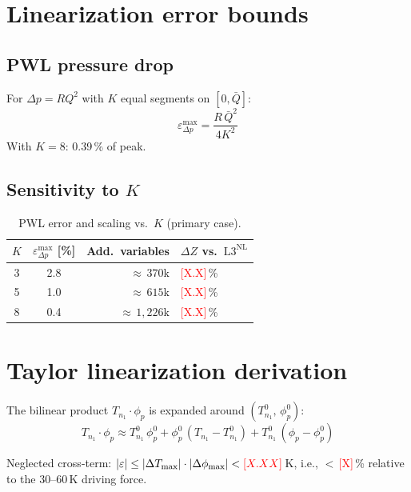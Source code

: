 \documentclass[review,3p]{elsarticle}
\newcommand{\placeholder}[1]{\textcolor{red}{[#1]}}
\newcommand{\Lnl}{\mathrm{L3}^{\mathrm{NL}}}
\begin{document}
\section{Linearization error bounds}
\label{app:pwl}

\subsection*{PWL pressure drop}

For $\Delta p = R Q^2$ with $K$ equal segments on $[0, \bar{Q}]$:
\begin{equation*}
  \varepsilon_{\Delta p}^{\max} = \frac{R\, \bar{Q}^2}{4K^2}
\end{equation*}
With $K=8$: 0.39\,\% of peak.

\subsection*{Sensitivity to $K$}

\begin{table}[htbp]
\centering
\caption{PWL error and scaling vs.\ $K$ (primary case).}
\label{tab:pwl_sensitivity}
\small
\begin{tabular}{@{} c c r l @{}}
\toprule
$K$ & $\varepsilon_{\Delta p}^{\max}$ [\%]
  & Add.\ variables & $\Delta Z$ vs.\ $\Lnl$ \\
\midrule
3 & 2.8 & ${\approx}\,370$k & \placeholder{X.X}\,\% \\
5 & 1.0 & ${\approx}\,615$k & \placeholder{X.X}\,\% \\
8 & 0.4 & ${\approx}\,1{,}226$k & \placeholder{X.X}\,\% \\
\bottomrule
\end{tabular}
\end{table}

\section{Taylor linearization derivation}
\label{app:taylor_derivation}

The bilinear product $T_{n_1} \cdot \phi_p$ is expanded around
$(T_{n_1}^0,\, \phi_p^0)$:
\begin{equation}
  T_{n_1} \cdot \phi_p \approx
    T_{n_1}^0\, \phi_p^0
    + \phi_p^0\, (T_{n_1} - T_{n_1}^0)
    + T_{n_1}^0\, (\phi_p - \phi_p^0)
\end{equation}

Neglected cross-term:
$|\varepsilon| \leq |\Delta T_{\max}| \cdot |\Delta \phi_{\max}|
< \placeholder{X.XX}$\,K, i.e.,
${<}\,$\placeholder{X}\,\% relative to the 30--60\,K driving force.
\end{document}
